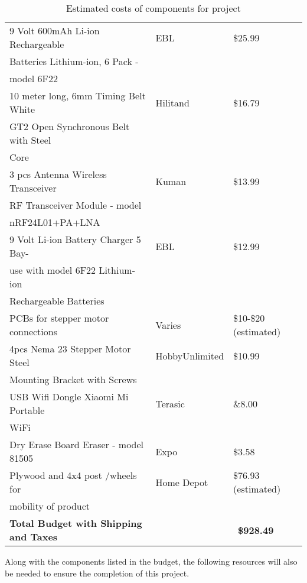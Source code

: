 \begin{table} [H]
\begin{tabular}{|l|l|l|}
		\hline
		9 Volt 600mAh Li-ion Rechargeable   & EBL 			& \$25.99 \\
		Batteries Lithium-ion, 6 Pack -		&				&	\\
		model 6F22							&				&	\\
		\hline
		10 meter long, 6mm Timing Belt White& Hilitand		& \$16.79 \\
		GT2 Open Synchronous Belt with Steel&				&	\\
		Core								&				&	\\
		\hline
		3 pcs Antenna Wireless Transceiver 	& Kuman 		& \$13.99 \\
		RF Transceiver Module - model 		&				&	\\
		nRF24L01+PA+LNA						&				&	\\
		\hline
		9 Volt Li-ion Battery Charger 5 Bay-& EBL			& \$12.99 \\
		use with model 6F22 Lithium-ion		&				&	\\
		Rechargeable Batteries				&				&	\\
		\hline
		PCBs for stepper motor connections  & Varies		& \$10-\$20 (estimated)\\
		\hline 
		4pcs Nema 23 Stepper Motor Steel	& HobbyUnlimited& \$10.99 \\
		Mounting Bracket with Screws		& 				&	\\
		\hline
		USB Wifi Dongle Xiaomi Mi Portable  & Terasic		& \&8.00 \\
		WiFi								&				&	\\
		\hline
		Dry Erase Board Eraser - model 81505& Expo			& \$3.58 \\
		\hline
		Plywood and 4x4 post /wheels for	& Home Depot	& \$76.93 (estimated) \\
		mobility of product					&				&	\\
		\hline
											\textbf{Total Budget with Shipping and Taxes} & & \ \textbf{\$928.49} \\
		\hline 
	\end{tabular} 
	\caption{Estimated costs of components for project}
	\label{table:1}
\end{table}	

Along with the components listed in the budget, the following resources will also be needed to ensure the completion of this project.

